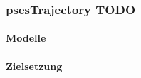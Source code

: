\subsubsection{psesTrajectory TODO} %
\label{subsec:02psesTrajectory}
\paragraph{Modelle}

\paragraph{Zielsetzung}
